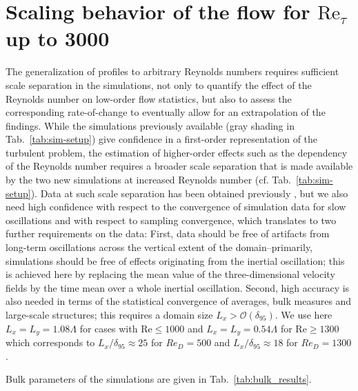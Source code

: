 \documentclass[smallcondensed,final]{svjour3}
\newcommand{\RE}{\mathrm{Re}}
\begin{document}
\section{Scaling behavior of the flow for $\RE_\tau$ up to 3000}
\label{sec:scaling}
%
The generalization of profiles to arbitrary Reynolds numbers 
requires sufficient scale separation in the simulations, not only to quantify the effect of
the Reynolds number on low-order flow statistics, but also to assess the corresponding rate-of-change
to eventually allow for an extrapolation of the findings.
%
While the simulations previously available (gray shading in Tab.~\ref{tab:sim-setup})
give confidence in a first-order representation of the turbulent
problem, the estimation of higher-order effects such as the dependency of the Reynolds number requires
a broader scale separation that is made available by the two new simulations at increased Reynolds number  
(cf. Tab.~\ref{tab:sim-setup}). 
%
%
Data at such scale separation has been obtained previously \citep[cf.][]{spalart:PF2008,spalart:PF2009}, 
but we also need high confidence with respect to the convergence of simulation data for slow oscillations 
and with respect to sampling convergence, which translates to two further requirements on the data: 
%
First, data should be free of artifacts from long-term oscillations across the vertical
extent of the domain--primarily, simulations should be free of effects originating from the
inertial oscillation; this is achieved here by replacing the mean value of the three-dimensional
velocity fields by the time mean over a whole inertial oscillation. 
%
Second, high accuracy is also needed in terms of the statistical convergence of averages,
bulk measures and large-scale structures; this requires a domain size $L_{x} > \mathcal{O}(\delta_{95})$. 
%
We use here $L_{x}=L_{y}=1.08\Lambda$ for cases with $\RE \le 1000$ and
$L_{x}=L_{y}=0.54\Lambda$ for $\RE \ge 1300$ which corresponds to $L_{x}/\delta_{95}\approx 25$ for $Re_D=500$
and $L_{x}/\delta_{95} \approx 18$ for $Re_D=1300$.
%
\par
%
Bulk parameters of the simulations are given in Tab.~\ref{tab:bulk_results}.
\end{document}
